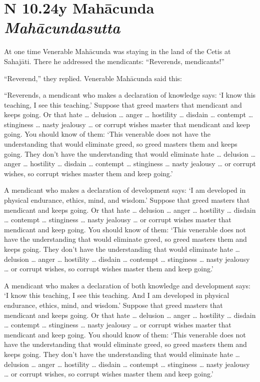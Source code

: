 \documentclass[12pt,openany]{book}%
\newcommand*{\suttatitleacronym}[1]{\smaller[2]{#1}\vspace*{.3em}}
\newcommand*{\suttatitletranslation}[1]{\linebreak{#1}}
\newcommand*{\suttatitleroot}[1]{\linebreak\smaller[2]\itshape{#1}}
\newcommand*{\tocacronym}[1]{\hspace*{-3.3em}{#1}\quad}
\newcommand*{\toctranslation}[1]{#1}
\newcommand*{\tocroot}[1]{(\textit{#1})}
\begin{document}
%
\section*{{\suttatitleacronym AN 10.24}{\suttatitletranslation By Mahācunda }{\suttatitleroot Mahācundasutta}}
\addcontentsline{toc}{section}{\tocacronym{AN 10.24} \toctranslation{By Mahācunda } \tocroot{Mahācundasutta}}

At one time Venerable \textsanskrit{Mahācunda} was staying in the land of the Cetis at \textsanskrit{Sahajāti}. There he addressed the mendicants: “Reverends, mendicants!” 

“Reverend,” they replied. Venerable \textsanskrit{Mahācunda} said this: 

“Reverends, a mendicant who makes a declaration of knowledge says: ‘I know this teaching, I see this teaching.’ Suppose that greed masters that mendicant and keeps going. Or that hate … delusion … anger … hostility … disdain … contempt … stinginess … nasty jealousy … or corrupt wishes master that mendicant and keep going. You should know of them: ‘This venerable does not have the understanding that would eliminate greed, so greed masters them and keeps going. They don’t have the understanding that would eliminate hate … delusion … anger … hostility … disdain … contempt … stinginess … nasty jealousy … or corrupt wishes, so corrupt wishes master them and keep going.’ 

A mendicant who makes a declaration of development says: ‘I am developed in physical endurance, ethics, mind, and wisdom.’ Suppose that greed masters that mendicant and keeps going. Or that hate … delusion … anger … hostility … disdain … contempt … stinginess … nasty jealousy … or corrupt wishes master that mendicant and keep going. You should know of them: ‘This venerable does not have the understanding that would eliminate greed, so greed masters them and keeps going. They don’t have the understanding that would eliminate hate … delusion … anger … hostility … disdain … contempt … stinginess … nasty jealousy … or corrupt wishes, so corrupt wishes master them and keep going.’ 

A mendicant who makes a declaration of both knowledge and development says: ‘I know this teaching, I see this teaching. And I am developed in physical endurance, ethics, mind, and wisdom.’ Suppose that greed masters that mendicant and keeps going. Or that hate … delusion … anger … hostility … disdain … contempt … stinginess … nasty jealousy … or corrupt wishes master that mendicant and keep going. You should know of them: ‘This venerable does not have the understanding that would eliminate greed, so greed masters them and keeps going. They don’t have the understanding that would eliminate hate … delusion … anger … hostility … disdain … contempt … stinginess … nasty jealousy … or corrupt wishes, so corrupt wishes master them and keep going.’ 
\end{document}
